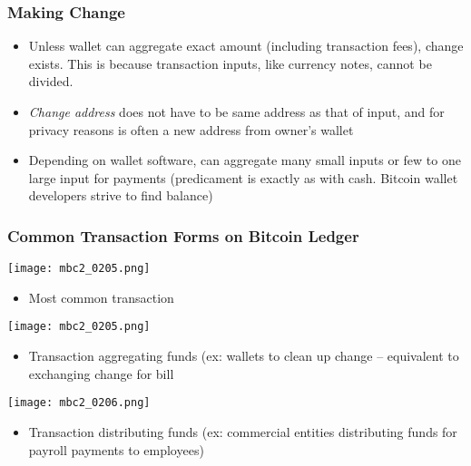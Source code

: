 \documentclass[english, 11pt]{article}
\begin{document}
\subsubsection{Making Change}
\begin{itemize}
    \item Unless wallet can aggregate exact amount (including transaction fees), change exists. This is because transaction inputs, like currency notes, cannot be divided.
    \item \textit{Change address} does not have to be same address as that of input, and for privacy reasons is often a new address from owner's wallet
    \item Depending on wallet software, can aggregate many small inputs or few to one large input for payments (predicament is exactly as with cash. Bitcoin wallet developers strive to find balance)
\end{itemize}

\subsubsection{Common Transaction Forms on Bitcoin Ledger}
\begin{tcolorbox}
\begin{minipage}{0.2\linewidth}
    \texttt{[image: mbc2\_0205.png]}
\end{minipage}\hfil
\begin{minipage}{0.5\linewidth}
\begin{itemize}
    \item Most common transaction
\end{itemize}
\end{minipage}
\end{tcolorbox}

\begin{tcolorbox}
\begin{minipage}{0.2\linewidth}
    \texttt{[image: mbc2\_0205.png]}
\end{minipage}\hfil
\begin{minipage}{0.5\linewidth}
\begin{itemize}
    \item Transaction aggregating funds (ex: wallets to clean up change -- equivalent to exchanging change for bill
\end{itemize}
\end{minipage}
\end{tcolorbox}

\begin{tcolorbox}
\begin{minipage}{0.2\linewidth}
    \texttt{[image: mbc2\_0206.png]}
\end{minipage}\hfil
\begin{minipage}{0.5\linewidth}
\begin{itemize}
    \item Transaction distributing funds (ex: commercial entities distributing funds for payroll payments to employees)
\end{itemize}
\end{minipage}
\end{tcolorbox}
\end{document}
